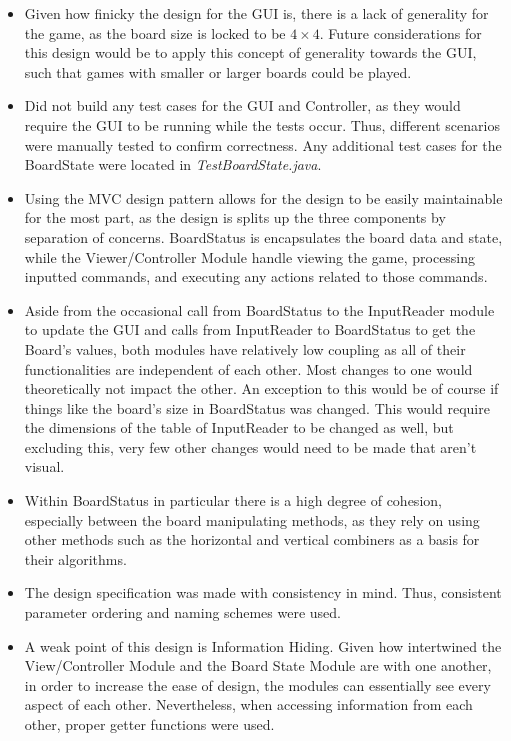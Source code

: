 \documentclass{article}
\begin{document}
\begin{itemize}
    \item Given how finicky the design for the GUI is, there is a lack of generality for the game, as the board size is locked to be $4 \times 4$. Future considerations for this design would be to apply this concept of generality towards the GUI, such that games with smaller or larger boards could be played.
    \item Did not build any test cases for the GUI and Controller, as they would require the GUI to be running while the tests occur. Thus, different scenarios were manually tested to confirm correctness. Any additional test cases for the BoardState were located in \textit{TestBoardState.java}.
    \item Using the MVC design pattern allows for the design to be easily maintainable for the most part, as the design is splits up the three components by separation of concerns. BoardStatus is encapsulates the board data and state, while the Viewer/Controller Module handle viewing the game, processing inputted commands, and executing any actions related to those commands.
    \item Aside from the occasional call from BoardStatus to the InputReader module to update the GUI and calls from InputReader to BoardStatus to get the Board's values, both modules have relatively low coupling as all of their functionalities are independent of each other. Most changes to one would theoretically not impact the other. An exception to this would be of course if things like the board's size in BoardStatus was changed. This would require the dimensions of the table of InputReader to be changed as well, but excluding this, very few other changes would need to be made that aren't visual.
    \item Within BoardStatus in particular there is a high degree of cohesion, especially between the board manipulating methods, as they rely on using other methods such as the horizontal and vertical combiners as a basis for their algorithms.
    \item The design specification was made with consistency in mind. Thus, consistent parameter ordering and naming schemes were used. 
    \item A weak point of this design is Information Hiding. Given how intertwined the View/Controller Module and the Board State Module are with one another, in order to increase the ease of design, the modules can essentially see every aspect of each other. Nevertheless, when accessing information from each other, proper getter functions were used.
\end{itemize}
\newpage
\end{document}
